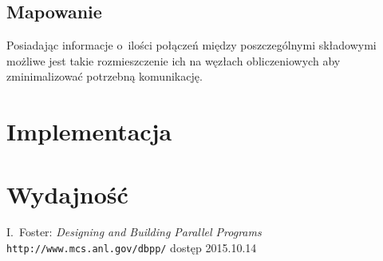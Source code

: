 \documentclass[a4paper; 12pt]{article}
\begin{document}
\subsection{Mapowanie}
Posiadając informacje o~ilości połączeń między poszczególnymi składowymi
możliwe jest takie rozmieszczenie ich na węzłach obliczeniowych aby
zminimalizować potrzebną komunikację.

\section{Implementacja}

\section{Wydajność}

\begin{thebibliography}{9}
        I.~Foster: \emph{Designing and Building Parallel Programs}
        \texttt{http://www.mcs.anl.gov/dbpp/} dostęp 2015.10.14
\end{thebibliography}
\end{document}
